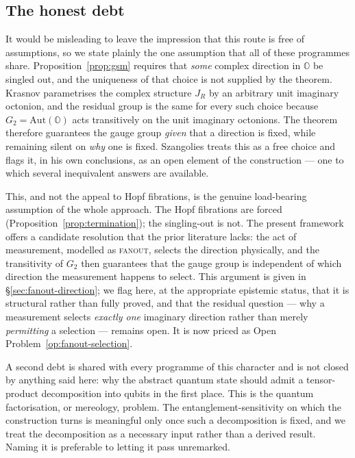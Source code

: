 \subsection{The honest debt}
\label{sec:hopf-honest-debt}

It would be misleading to leave the impression that this route is free of assumptions, so we
state plainly the one assumption that all of these programmes share. Proposition~\ref{prop:gsm}
requires that \emph{some} complex direction in $\mathbb{O}$ be singled out, and the uniqueness
of that choice is not supplied by the theorem. Krasnov parametrises the complex structure $J_R$
by an arbitrary unit imaginary octonion, and the residual group is the same for every such
choice because $G_2 = \mathrm{Aut}(\mathbb{O})$ acts transitively on the unit imaginary
octonions. The theorem therefore guarantees the gauge group \emph{given} that a direction is
fixed, while remaining silent on \emph{why} one is fixed. Szangolies treats this as a free
choice and flags it, in his own conclusions, as an open element of the construction --- one to
which several inequivalent answers are available.

This, and not the appeal to Hopf fibrations, is the genuine load-bearing assumption of the whole
approach. The Hopf fibrations are forced (Proposition~\ref{prop:termination}); the singling-out
is not. The present framework offers a candidate resolution that the prior literature lacks: the
act of measurement, modelled as \textsc{fanout}, selects the direction physically, and the
transitivity of $G_2$ then guarantees that the gauge group is independent of which direction the
measurement happens to select. This argument is given in \S\ref{sec:fanout-direction}; we flag
here, at the appropriate epistemic status, that it is structural rather than fully proved, and
that the residual question --- why a measurement selects \emph{exactly one} imaginary direction
rather than merely \emph{permitting} a selection --- remains open. It is now priced as Open
Problem~\ref{op:fanout-selection}.

A second debt is shared with every programme of this character and is not closed by anything
said here: why the abstract quantum state should admit a tensor-product decomposition into
qubits in the first place. This is the quantum factorisation, or mereology, problem. The
entanglement-sensitivity on which the construction turns is meaningful only once such a
decomposition is fixed, and we treat the decomposition as a necessary input rather than a
derived result. Naming it is preferable to letting it pass unremarked.

